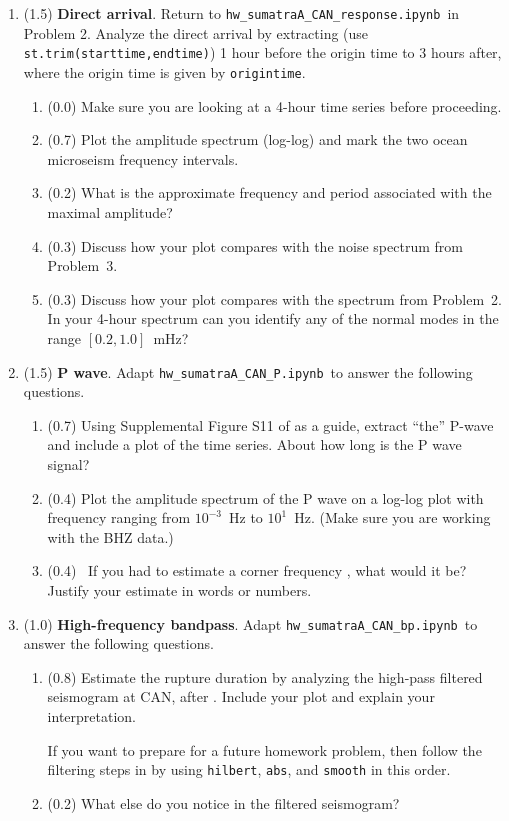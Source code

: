 \documentclass[11pt,titlepage,fleqn]{article}
\newcommand{\tfileresponse}{{\tt hw\_sumatraA\_CAN\_response.ipynb}}
\newcommand{\tfileP}{{\tt hw\_sumatraA\_CAN\_P.ipynb}}
\newcommand{\tfilebp}{{\tt hw\_sumatraA\_CAN\_bp.ipynb}}
\begin{document}
\begin{enumerate}
\item (1.5) {\bf Direct arrival}. 
Return to \tfileresponse\ in Problem 2.
Analyze the direct arrival by extracting (use \verb+st.trim(starttime,endtime)+) 1 hour before the origin time to 3 hours after, where the origin time is given by \verb+origintime+.

\begin{enumerate}
\item (0.0) Make sure you are looking at a 4-hour time series before proceeding.
\item (0.7) Plot the amplitude spectrum (log-log) and mark the two ocean microseism frequency intervals.
\item (0.2) What is the approximate frequency and period associated with the maximal amplitude?
\item (0.3) Discuss how your plot compares with the noise spectrum from Problem~3.
\item (0.3) Discuss how your plot compares with the spectrum from Problem~2. \\
In your 4-hour spectrum can you identify any of the normal modes in the range $[0.2,1.0]$~mHz?
\end{enumerate}


\item (1.5) {\bf P wave}. Adapt \tfileP\ to answer the following questions.
%
\begin{enumerate}
\item (0.7) Using Supplemental Figure S11 of \citet{Ammon2005} as a guide, extract ``the'' P-wave and include a plot of the time series. About how long is the P wave signal?
\item (0.4) Plot the amplitude spectrum of the P wave on a log-log plot with frequency ranging from $10^{-3}$~Hz to $10^1$~Hz. (Make sure you are working with the BHZ data.)

\item (0.4) \ptag\ If you had to estimate a corner frequency \citep[][p.~267]{SteinWysession}, what would it be? Justify your estimate in words or numbers.
\end{enumerate}


\item (1.0) {\bf High-frequency bandpass}. Adapt \tfilebp\ to answer the following questions.
%
\begin{enumerate}
\item (0.8) Estimate the rupture duration by analyzing the high-pass filtered seismogram at CAN, after \citet{Ni2005}. Include your plot and explain your interpretation.

If you want to prepare for a future homework problem, then follow the filtering steps in \citet{Ni2005} by using \verb+hilbert+, \verb+abs+, and \verb+smooth+ in this order.

\item (0.2) What else do you notice in the filtered seismogram?
\end{enumerate}

\end{enumerate}
\end{document}
